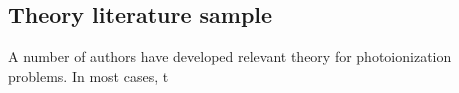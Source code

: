 \subsection{Theory literature sample\label{sec:theory-lit}}

A number of authors have developed relevant theory for photoionization problems. In most cases, t